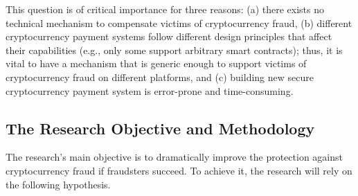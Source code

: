 

This question is of critical importance for three reasons: (a) there exists no technical mechanism to compensate victims of cryptocurrency fraud, (b) different cryptocurrency payment systems follow different design principles that affect their capabilities (e.g., only some support arbitrary smart contracts); thus, it is vital to have a mechanism that is generic enough to support victims of cryptocurrency fraud on different platforms, and (c) building new secure cryptocurrency payment system is error-prone and time-consuming. 






\subsection{The Research Objective and Methodology}

The research’s main objective is to dramatically improve the protection against cryptocurrency fraud if fraudsters succeed. To achieve it, the research will rely on the following hypothesis. 

 
 
 
 \vs
\noindent{}

